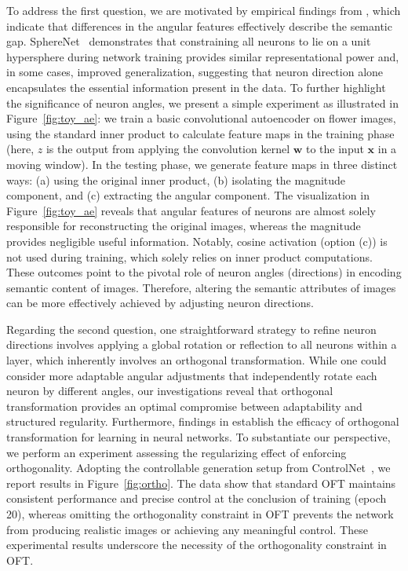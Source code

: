 To address the first question, we are motivated by empirical findings from \cite{liu2018decoupled,chen2020angular}, which indicate that differences in the angular features effectively describe the semantic gap. SphereNet~\cite{liu2017deep} demonstrates that constraining all neurons to lie on a unit hypersphere during network training provides similar representational power and, in some cases, improved generalization, suggesting that neuron direction alone encapsulates the essential information present in the data. To further highlight the significance of neuron angles, we present a simple experiment as illustrated in Figure~\ref{fig:toy_ae}: we train a basic convolutional autoencoder on flower images, using the standard inner product to calculate feature maps in the training phase (here, $z$ is the output from applying the convolution kernel $\bm{w}$ to the input $\bm{x}$ in a moving window). In the testing phase, we generate feature maps in three distinct ways: (a) using the original inner product, (b) isolating the magnitude component, and (c) extracting the angular component. The visualization in Figure~\ref{fig:toy_ae} reveals that angular features of neurons are almost solely responsible for reconstructing the original images, whereas the magnitude provides negligible useful information. Notably, cosine activation (option (c)) is not used during training, which solely relies on inner product computations. These outcomes point to the pivotal role of neuron angles (directions) in encoding semantic content of images. Therefore, altering the semantic attributes of images can be more effectively achieved by adjusting neuron directions.

Regarding the second question, one straightforward strategy to refine neuron directions involves applying a global rotation or reflection to all neurons within a layer, which inherently involves an orthogonal transformation. While one could consider more adaptable angular adjustments that independently rotate each neuron by different angles, our investigations reveal that orthogonal transformation provides an optimal compromise between adaptability and structured regularity. Furthermore, findings in \cite{liu2021orthogonal} establish the efficacy of orthogonal transformation for learning in neural networks. To substantiate our perspective, we perform an experiment assessing the regularizing effect of enforcing orthogonality. Adopting the controllable generation setup from ControlNet~\cite{zhang2023adding}, we report results in Figure~\ref{fig:ortho}. The data show that standard OFT maintains consistent performance and precise control at the conclusion of training (epoch 20), whereas omitting the orthogonality constraint in OFT prevents the network from producing realistic images or achieving any meaningful control. These experimental results underscore the necessity of the orthogonality constraint in OFT.

